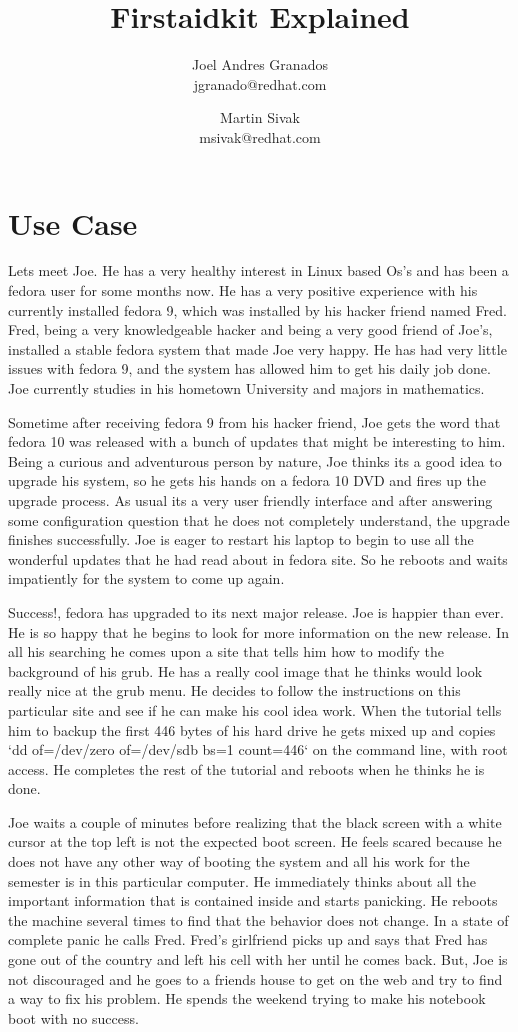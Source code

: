 \documentclass[a4paper,13pt]{article}
\title{Firstaidkit Explained}
\author{Joel Andres Granados \\ jgranado@redhat.com \and Martin Sivak \\ msivak@redhat.com}
\begin{document}
\maketitle

\section{Use Case}
Lets meet Joe.  He has a very healthy interest in Linux based Os's and has been a fedora user for some months now.  He has a very positive experience with his currently installed fedora 9, which was installed by his hacker friend named Fred.  Fred, being a very knowledgeable hacker and being a very good friend of Joe's, installed a stable fedora system that made Joe very happy.  He has had very little issues with fedora 9, and the system has allowed him to get his daily job done.  Joe currently studies in his hometown University and majors in mathematics.

Sometime after receiving fedora 9 from his hacker friend, Joe gets the word that fedora 10 was released with a bunch of updates that might be interesting to him.  Being a curious and adventurous person by nature, Joe thinks its a good idea to upgrade his system, so he gets his hands on a fedora 10 DVD and fires up the upgrade process.  As usual its a very user friendly interface and after answering some configuration question that he does not completely understand, the upgrade finishes successfully.  Joe is eager to restart his laptop to begin to use all the wonderful updates that he had read about in fedora site.  So he reboots and waits impatiently for the system to come up again.

Success!, fedora has upgraded to its next major release.  Joe is happier than ever.  He is so happy that he begins to look for more information on the new release.  In all his searching he comes upon a site that tells him how to modify the background of his grub.  He has a really cool image that he thinks would look really nice at the grub menu.  He decides to follow the instructions on this particular site and see if he can make his cool idea work.  When the tutorial tells him to backup the first 446 bytes of his hard drive he gets mixed up and copies `dd of=/dev/zero of=/dev/sdb bs=1 count=446` on the command line, with root access.  He completes the rest of the tutorial and reboots when he thinks he is done.

Joe waits a couple of minutes before realizing that the black screen with a white cursor at the top left is not the expected boot screen.  He feels scared because he does not have any other way of booting the system and all his work for the semester is in this particular computer.  He immediately thinks about all the important information that is contained inside and starts panicking.  He reboots the machine several times to find that the behavior does not change.  In a state of complete panic he calls Fred.  Fred's girlfriend picks up and says that Fred has gone out of the country and left his cell with her until he comes back.  But, Joe is not discouraged and he goes to a friends house to get on the web and try to find a way to fix his problem.  He spends the weekend trying to make his notebook boot with no success.
\end{document}
